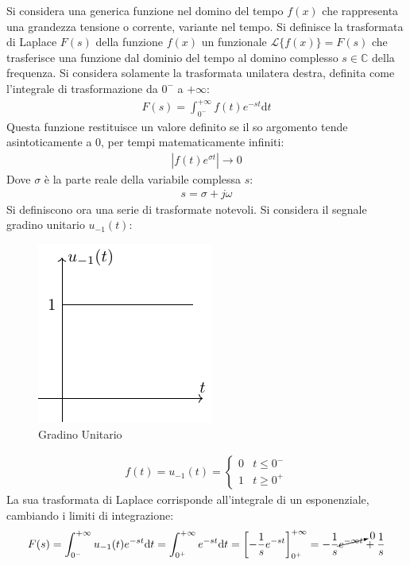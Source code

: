 \documentclass{article}
\newcommand{\df}{\mathrm{d}}
\numberwithin{equation}{subsection}
\begin{document}
Si considera una generica funzione nel domino del tempo $f(x)$ che rappresenta una grandezza tensione o corrente, variante nel tempo. 
Si definisce la trasformata di Laplace $F(s)$ della funzione $f(x)$ un funzionale $\mathcal{L}\{f(x)\}=F(s)$ che trasferisce una funzione dal dominio del tempo al domino 
complesso $s\in\mathbb{C}$ della frequenza. Si considera solamente la trasformata unilatera destra, definita come l'integrale di trasformazione da $0^-$ a $+\infty$:
\begin{gather}
    F(s)=\displaystyle\int_{0^-}^{+\infty}f(t)e^{-st}\df t
\end{gather}
Questa funzione restituisce un valore definito se il so argomento tende asintoticamente a $0$, per tempi matematicamente infiniti:
\begin{gather*}
    |f(t)e^{\sigma t}|\to0
\end{gather*}
Dove $\sigma$ è la parte reale della variabile complessa $s$:
\begin{gather*}
    s=\sigma+j\omega
\end{gather*}
Si definiscono ora una serie di trasformate notevoli. Si considera il segnale gradino unitario $u_{-1}(t)$:
\begin{figure}[ht]%
    \centering
    \includegraphics{gradino-unitario.pdf}
    \caption{Gradino Unitario}
    \label{fig:gradino-unitario}
\end{figure}
\begin{gather*}
    f(t)=u_{-1}(t)=\begin{cases}
        0&t\leq 0^-\\
        1&t\geq 0^+
    \end{cases}
\end{gather*}
La sua trasformata di Laplace corrisponde all'integrale di un esponenziale, cambiando i limiti di integrazione:
\begin{gather*}
    F(s)=\displaystyle\int_{0^-}^{+\infty}u_{-1}(t)e^{-st}\df t=\int_{0^+}^{+\infty}e^{-st}\df t=\left[-\frac{1}{s}e^{-st}\right]_{0^+}^{+\infty}=-\frac{1}{s}\cancelto{0}{e^{-\infty t}}+\frac{1}{s}
\end{gather*}
\end{document}
